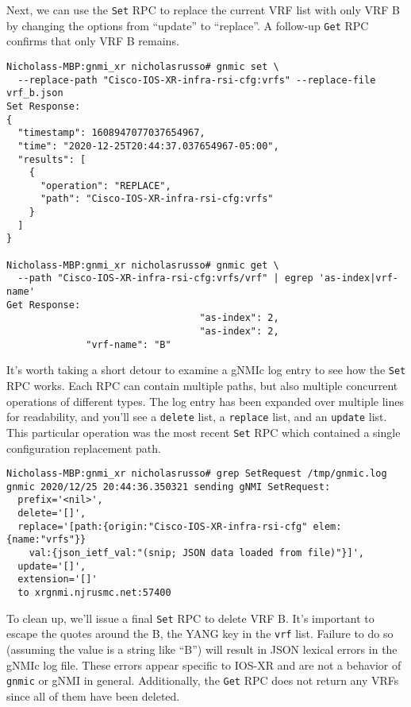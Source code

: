 Next, we can use the \verb|Set| RPC to replace the current VRF list
with only VRF B by changing the options from ``update'' to ``replace''.
A follow-up \verb|Get| RPC confirms that only VRF B remains.

\begin{verbatim}
Nicholass-MBP:gnmi_xr nicholasrusso# gnmic set \
  --replace-path "Cisco-IOS-XR-infra-rsi-cfg:vrfs" --replace-file vrf_b.json
Set Response:
{
  "timestamp": 1608947077037654967,
  "time": "2020-12-25T20:44:37.037654967-05:00",
  "results": [
    {
      "operation": "REPLACE",
      "path": "Cisco-IOS-XR-infra-rsi-cfg:vrfs"
    }
  ]
}

Nicholass-MBP:gnmi_xr nicholasrusso# gnmic get \
  --path "Cisco-IOS-XR-infra-rsi-cfg:vrfs/vrf" | egrep 'as-index|vrf-name'
Get Response:
                                  "as-index": 2,
                                  "as-index": 2,
              "vrf-name": "B"
\end{verbatim}

It's worth taking a short detour to examine a gNMIc log entry to see how
the \verb|Set| RPC works. Each RPC can contain multiple paths, but also
multiple concurrent operations of different types. The log entry has
been expanded over multiple lines for readability, and you'll see
a \verb|delete| list, a \verb|replace| list, and an \verb|update| list.
This particular operation was the most recent \verb|Set| RPC which
contained a single configuration replacement path.

\begin{verbatim}
Nicholass-MBP:gnmi_xr nicholasrusso# grep SetRequest /tmp/gnmic.log
gnmic 2020/12/25 20:44:36.350321 sending gNMI SetRequest:
  prefix='<nil>',
  delete='[]',
  replace='[path:{origin:"Cisco-IOS-XR-infra-rsi-cfg" elem:{name:"vrfs"}}
    val:{json_ietf_val:"(snip; JSON data loaded from file)"}]',
  update='[]',
  extension='[]'
  to xrgnmi.njrusmc.net:57400
\end{verbatim}

To clean up, we'll issue a final \verb|Set| RPC to delete VRF B\@. It's
important to escape the quotes around the B, the YANG key in the \verb|vrf|
list. Failure to do so (assuming the value is a string like ``B'') will result
in JSON lexical errors in the gNMIc log file. These errors appear specific to
IOS-XR and are not a behavior of \verb|gnmic| or gNMI in general.
Additionally, the \verb|Get| RPC does not return any VRFs since all of them
have been deleted.

